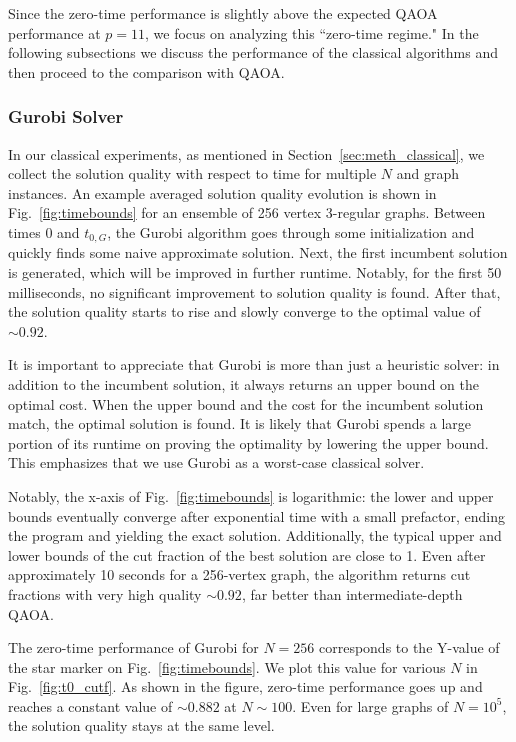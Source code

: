 Since the zero-time performance is slightly above the expected QAOA performance at $p=11$, we focus on analyzing this ``zero-time regime."
In the following subsections we discuss the performance of the classical algorithms and then proceed to the comparison with QAOA.

\subsubsection{Gurobi Solver}





In our classical experiments, as mentioned in Section~\ref{sec:meth_classical},
we collect the solution quality with respect to time for multiple $N$ and graph instances.
An example averaged solution quality evolution is shown in Fig.~\ref{fig:timebounds} for an ensemble of 256 vertex 3-regular graphs. Between times 0 and $t_{0, G}$, the Gurobi algorithm goes through some initialization and quickly finds some naive approximate solution. Next, the first incumbent solution is generated, which will be improved in further runtime. Notably, for the first 50 milliseconds, no significant improvement to solution quality is found. After that, the solution quality starts to rise and slowly converge to the optimal value of~$\sim 0.92$.



It is important to appreciate that Gurobi is more than just a heuristic solver: in addition to the incumbent solution, it always returns an upper bound on the optimal cost. 
When the upper bound and the cost for the incumbent solution match, the optimal solution is found.
It is likely that Gurobi spends a large portion of its runtime on proving the optimality by lowering the upper bound. This emphasizes that we use Gurobi as a worst-case classical solver.


Notably, the x-axis of Fig.~\ref{fig:timebounds} is logarithmic: the lower and upper bounds eventually converge after exponential time with a small prefactor, ending the program and yielding the exact solution. Additionally, the typical upper and lower bounds of the cut fraction of the best solution are close to 1. Even after approximately 10 seconds for a 256-vertex graph, the algorithm returns cut fractions with very high quality $\sim 0.92$, far better than intermediate-depth QAOA.

The zero-time performance of Gurobi for $N = 256$ corresponds to the Y-value of the star marker on Fig.~\ref{fig:timebounds}. We plot this value for various $N$ in Fig.~\ref{fig:t0_cutf}. As shown in the figure, zero-time performance goes up and reaches a constant value of $\sim 0.882$ at $N \sim 100$. Even for large graphs of $N = 10^5$, the solution quality stays at the same level.

